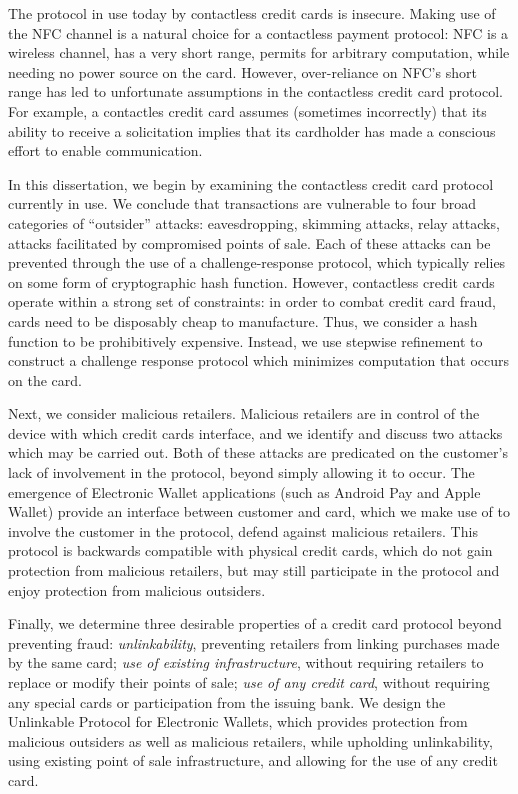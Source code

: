 The protocol in use today by contactless credit cards is insecure.
Making use of the NFC channel is a natural choice for a contactless payment protocol:
    NFC is a wireless channel, has a very short range, permits for arbitrary computation, while needing no power source on the card.
However, over-reliance on NFC's short range has led to unfortunate assumptions in the contactless credit card protocol.
For example, a contactles credit card assumes (sometimes incorrectly) that its ability to receive a solicitation implies that its cardholder has made a conscious effort to enable communication.

In this dissertation, we begin by examining the contactless credit card protocol currently in use.
We conclude that transactions are vulnerable to four broad categories of ``outsider'' attacks:
  eavesdropping, skimming attacks, relay attacks, attacks facilitated by compromised points of sale.
Each of these attacks can be prevented through the use of a challenge-response protocol,
    which typically relies on some form of cryptographic hash function.
However, contactless credit cards operate within a strong set of constraints:
    in order to combat credit card fraud, cards need to be disposably cheap to manufacture.
Thus, we consider a hash function to be prohibitively expensive.
Instead, we use stepwise refinement to construct a challenge response protocol which minimizes computation that occurs on the card.

Next, we consider malicious retailers.
Malicious retailers are in control of the device with which credit cards interface,
    and we identify and discuss two attacks which may be carried out.
Both of these attacks are predicated on the customer's lack of involvement in the protocol, beyond simply allowing it to occur.
The emergence of Electronic Wallet applications (such as Android Pay and Apple Wallet) provide an interface between customer and card,
    which we make use of to involve the customer in the protocol, defend against malicious retailers.
This protocol is backwards compatible with physical credit cards, which do not gain protection from malicious retailers,
    but may still participate in the protocol and enjoy protection from malicious outsiders.

Finally, we determine three desirable properties of a credit card protocol beyond preventing fraud:
    \emph{unlinkability}, preventing retailers from linking purchases made by the same card;
    \emph{use of existing infrastructure}, without requiring retailers to replace or modify their points of sale;
    \emph{use of any credit card}, without requiring any special cards or participation from the issuing bank.
We design the Unlinkable Protocol for Electronic Wallets, which provides protection from malicious outsiders as well as malicious retailers,
    while upholding unlinkability, using existing point of sale infrastructure, and allowing for the use of any credit card.
